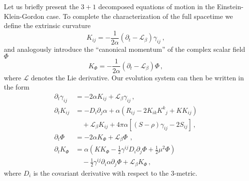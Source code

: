 Let us briefly present the $3+1$ decomposed equations of motion in the Einstein-Klein-Gordon case. To complete the characterization of the full spacetime we define the extrinsic curvature
\begin{equation}
\label{eq:KijDef}
K_{ij}  =   - \frac{1}{2\alpha} \left( \partial_{t} - \mathcal{L}_{\beta} \right) \gamma_{ij} \ ,
\end{equation}
and analogously introduce the ``canonical momentum'' of the complex scalar field $\Phi$
\begin{equation}
\label{eq:Kphi}
K_{\Phi} = -\frac{1}{2\alpha}  \left( \partial_{t} - \mathcal{L}_{\beta} \right) \Phi \,,
\end{equation}
where $\mathcal{L}$ denotes the Lie derivative.
%
Our evolution system can then be written in the form
%
\begin{align}
  \partial_{t} \gamma_{ij} & = - 2 \alpha K_{ij} + \mathcal{L}_{\beta} \gamma_{ij} \,,
                       \label{eq:dtgamma} \\
%
  \partial_{t} K_{ij}      & =  - D_{i} \partial_{j} \alpha
                       + \alpha \left( R_{ij} - 2 K_{ik} K^{k}{}_{j} + K K_{ij} \right) \nonumber \\
                       & \quad + \mathcal{L}_{\beta} K_{ij} 
                       + 4\pi \alpha \left[ (S-\rho) \gamma_{ij} - 2 S_{ij} \right] \,,
                                         \label{eq:dtKij} \\
% 
  \partial_{t} \Phi & = - 2 \alpha K_\Phi + \mathcal{L}_{\beta} \Phi\
                \,, \label{eq:dtPhi} \\
%
  \partial_{t} K_\Phi &  = \alpha \left( K K_{\Phi} - \frac{1}{2} \gamma^{ij} D_i \partial_j \Phi
                  + \frac{1}{2} \mu^2 \Phi \right) \nonumber \\
                 & \quad - \frac{1}{2} \gamma^{ij} \partial_i \alpha \partial_j \Phi
                       + \mathcal{L}_{\beta} K_\Phi \,, \label{eq:dtKphi}
\end{align}
% 
where $D_i$ is the covariant derivative with respect to the $3$-metric.


